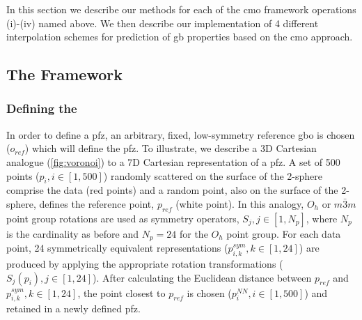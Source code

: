 \documentclass[preprint,12pt]{elsarticle}
\begin{document}
In this section we describe our methods for each of the \gls{cmo} framework operations (i)-(iv) named above. We then describe our implementation of 4 different interpolation schemes for prediction of \gls{gb} properties based on the \gls{cmo} approach.

\subsection{The  Framework}
\label{sec:methods:framework}

\subsubsection{Defining the }
\label{sec:methods:pFZ}


In order to define a \gls{pfz}, an arbitrary, fixed, low-symmetry reference \gls{gbo} is chosen ($o_{ref}$) which will define the \gls{pfz}. To illustrate, we describe a 3D Cartesian analogue (\cref{fig:voronoi}) to a 7D Cartesian representation of a \gls{pfz}. A set of \num{500} points ($p_i, i\in[1,500]$) randomly scattered on the surface of the 2-sphere comprise the data (red points) and a random point, also on the surface of the 2-sphere, defines the reference point, $p_{ref}$ (white point). In this analogy, $O_h$ or $m\bar{3}m$ point group rotations are used as symmetry operators, $S_j,j\in[1,N_p]$, where $N_p$ is the cardinality as before and $N_p = 24$ for the $O_h$  point group. For each data point, \num{24} symmetrically equivalent representations ($p^{sym}_{i,k},k\in[1,24]$) are produced by applying the appropriate rotation transformations ($S_j(p_i),j\in[1,24]$). After calculating the Euclidean distance between $p_{ref}$ and $p^{sym}_{i,k},k\in[1,24]$, the point closest to $p_{ref}$ is chosen ($p^{NN}_i,i\in[1,500]$) and retained in a newly defined \gls{pfz}.
\end{document}
